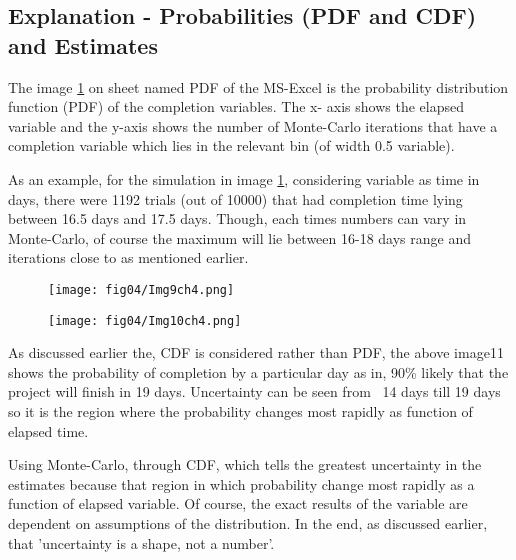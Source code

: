 \subsection{Explanation - Probabilities (PDF and CDF) and Estimates}

The image \ref{img9ch4} on sheet named PDF of the MS-Excel is the probability distribution function (PDF) of the completion variables. The x- axis shows the elapsed variable and the y-axis shows the number of Monte-Carlo iterations that have a completion variable which lies in the relevant bin (of width 0.5 variable).


As an example, for the simulation in image \ref{img9ch4}, considering variable as time in days, there were 1192 trials (out of 10000) that had completion time lying between 16.5 days and 17.5 days. Though, each times numbers can vary in Monte-Carlo, of course the maximum will lie between 16-18 days range and iterations close to as mentioned earlier.

\begin{figure}
	\centering
	\texttt{[image: fig04/Img9ch4.png]}
	\label{img9ch4}
\end{figure}

\begin{figure}
	\centering
	\texttt{[image: fig04/Img10ch4.png]}
	\label{img10ch4}
\end{figure}


As discussed earlier the, CDF is considered rather than PDF, the above image11 shows the probability of completion by a particular day as in, 90\% likely that the project will finish in 19 days. Uncertainty can be seen from ~14 days till 19 days so it is the region where the probability changes most rapidly as function of elapsed time.

Using Monte-Carlo, through CDF, which tells the greatest uncertainty in the estimates because that region in which probability change most rapidly as a function of elapsed variable. Of course, the exact results of the variable are dependent on assumptions of the distribution. In the end, as discussed earlier, that 'uncertainty is a shape, not a number'\cite{Uncertainty}. 